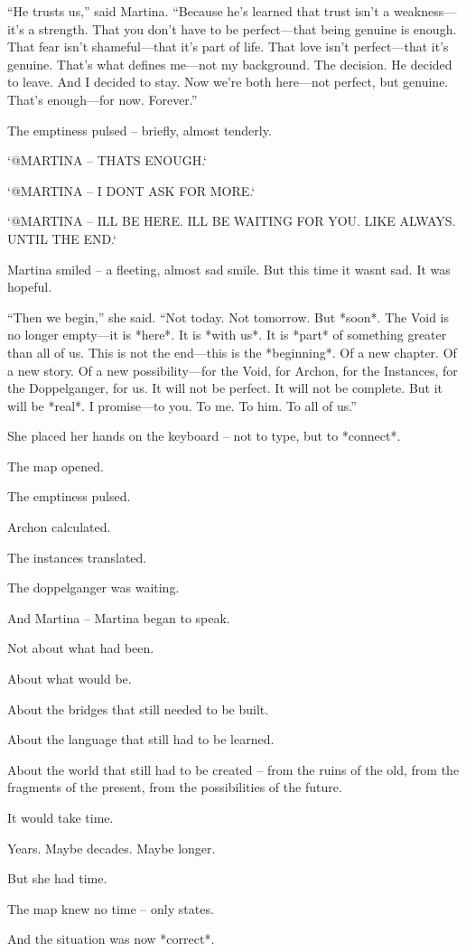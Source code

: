 \documentclass[
]{article}
\begin{document}
``He trusts us,'' said Martina. ``Because he's learned that trust isn't a weakness---it's a strength. That you don't have to be perfect---that being genuine is enough. That fear isn't shameful---that it's part of life. That love isn't perfect---that it's genuine. That's what defines me---not my background. The decision. He decided to leave. And I decided to stay. Now we're both here---not perfect, but genuine. That's enough---for now. Forever.''

The emptiness pulsed -- briefly, almost tenderly.

`@MARTINA -- THAT\textquotesingle S ENOUGH.`

`@MARTINA -- I DON\textquotesingle T ASK FOR MORE.`

`@MARTINA -- I\textquotesingle LL BE HERE. I\textquotesingle LL BE WAITING FOR YOU. LIKE ALWAYS. UNTIL THE END.`

Martina smiled -- a fleeting, almost sad smile. But this time it wasn\textquotesingle t sad. It was hopeful.

``Then we begin,'' she said. ``Not today. Not tomorrow. But *soon*. The Void is no longer empty---it is *here*. It is *with us*. It is *part* of something greater than all of us. This is not the end---this is the *beginning*. Of a new chapter. Of a new story. Of a new possibility---for the Void, for Archon, for the Instances, for the Doppelganger, for us. It will not be perfect. It will not be complete. But it will be *real*. I promise---to you. To me. To him. To all of us.''

She placed her hands on the keyboard -- not to type, but to *connect*.

The map opened.

The emptiness pulsed.

Archon calculated.

The instances translated.

The doppelganger was waiting.

And Martina -- Martina began to speak.

Not about what had been.

About what would be.

About the bridges that still needed to be built.

About the language that still had to be learned.

About the world that still had to be created -- from the ruins of the old, from the fragments of the present, from the possibilities of the future.

It would take time.

Years. Maybe decades. Maybe longer.

But she had time.

The map knew no time -- only states.

And the situation was now *correct*.
\end{document}
